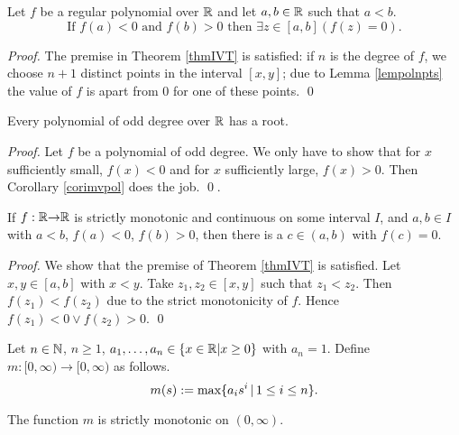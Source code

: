 \begin{corollary}\label{corimvpol} 
Let $f$ be a regular polynomial over $\mathbb{R}$ and let $a,b\in \mathbb{R}$ such that
$a<b$. 
$$\mbox{If }f(a) < 0\mbox{ and }f(b)>0\mbox{ then }\exists z\in[a,b](f(z)=0).$$
\end{corollary}

\begin{proof}
The premise in Theorem \ref{thmIVT} is satisfied: if $n$ is the
degree of $f$, we choose $n+1$ distinct points in the interval
$[x,y]$; due to Lemma \ref{lempolnpts} the value of $f$ is apart from
$0$ for one of these points. \qed
\end{proof}

\begin{proposition}
\label{proppolRodd}
  Every polynomial of odd degree over $\mathbb{R}$ has a root.
\end{proposition}

\begin{proof}
Let $f$ be a polynomial of odd degree.
We only have to show that for $x$ sufficiently small, $f(x) <0$ and
for $x$ sufficiently large, $f(x) >0$. Then Corollary \ref{corimvpol}
does the job. \qed. 
\end{proof}

\begin{lemma}\label{lemivtstrmon} 
If $f:\mathbb{R}{\rightarrow}\mathbb{R}$ is strictly monotonic and continuous on some
interval $I$, and $a,b\in I$ with $a<b$, $f(a)<0$, $f(b)>0$, then there
is a $c\in (a,b)$ with $f(c)=0$.
\end{lemma}

\begin{proof}
We show that the premise of Theorem \ref{thmIVT} is satisfied. Let
$x, y \in [a,b]$ with $x<y$. Take $z_1,z_2 \in [x,y]$ such that
$z_1<z_2$. Then $f(z_1)<f(z_2)$ due to the strict monotonicity of
$f$. Hence $f(z_1)<0 \vee f(z_2) >0$.
\qed
\end{proof}

\begin{definition} Let $n\in\mathbb{N}$, $n\geq 1$, $a_1, \ldots , a_n \in \{
x\in \mathbb{R}| x\geq 0\}$ with $a_n = 1$.
Define $m : [0, \infty) \rightarrow  [0, \infty)$ as follows.
$$ m(s) := \mbox{max} \{ a_i s^i \, |\, 1\leq i \leq n \}.$$
\end{definition}

\begin{lemma}\label{lemstrmonm}
The function $m$ is strictly monotonic on $(0,\infty)$.
\end{lemma}


